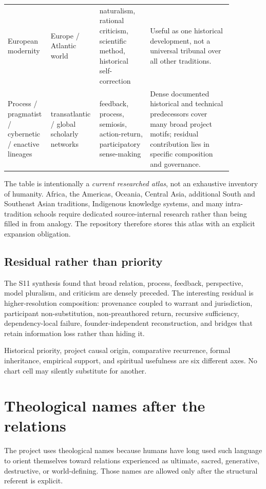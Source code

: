 \documentclass[11pt]{article}
\begin{document}
\begin{center}
\begin{longtable}{p{0.16\linewidth}p{0.15\linewidth}p{0.21\linewidth}p{0.35\linewidth}}
European modernity & Europe / Atlantic world & naturalism, rational criticism, scientific method, historical self-correction & Useful as one historical development, not a universal tribunal over all other traditions.\\
Process / pragmatist / cybernetic / enactive lineages & transatlantic / global scholarly networks & feedback, process, semiosis, action-return, participatory sense-making & Dense documented historical and technical predecessors cover many broad project motifs; residual contribution lies in specific composition and governance.\\
\bottomrule
\end{longtable}
\end{center}

The table is intentionally a \emph{current researched atlas}, not an exhaustive
inventory of humanity.  Africa, the Americas, Oceania, Central Asia, additional
South and Southeast Asian traditions, Indigenous knowledge systems, and many
intra-tradition schools require dedicated source-internal research rather than
being filled in from analogy.  The repository therefore stores this atlas with an
explicit expansion obligation.

\subsection{Residual rather than priority}
The S11 synthesis found that broad relation, process, feedback, perspective,
model pluralism, and criticism are densely preceded.  The interesting residual is
higher-resolution composition: provenance coupled to warrant and jurisdiction,
participant non-substitution, non-preauthored return, recursive sufficiency,
dependency-local failure, founder-independent reconstruction, and bridges that
retain information loss rather than hiding it.

\begin{devilaudit}
Historical priority, project causal origin, comparative recurrence, formal
inheritance, empirical support, and spiritual usefulness are six different axes.
No chart cell may silently substitute for another.
\end{devilaudit}

\section{Theological names after the relations}

The project uses theological names because humans have long used such language to orient themselves toward relations experienced as ultimate, sacred, generative, destructive, or world-defining. Those names are allowed only after the structural referent is explicit.
\end{document}
